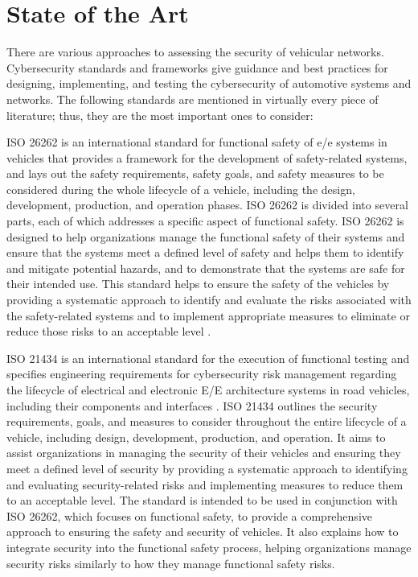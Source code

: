 \chapter{State of the Art}
\label{chp:stateoftheart}

There are various approaches to assessing the security of vehicular networks. Cybersecurity standards and frameworks give guidance and best practices for designing, implementing, and testing the cybersecurity of automotive systems and networks. 
The following standards are mentioned in virtually every piece of literature; thus, they are the most important ones to consider:

ISO 26262 is an international standard for functional safety of \gls{e/e} systems in vehicles that provides a framework for the development of safety-related systems, 
and lays out the safety requirements, safety goals, and safety measures to be considered during the whole lifecycle of a vehicle, including the design, development, production, and operation phases.
ISO 26262 is divided into several parts, each of which addresses a specific aspect of functional safety.
ISO 26262 is designed to help organizations manage the functional safety of their systems and ensure that the systems meet a defined level of safety and helps them to identify and mitigate potential hazards, and to demonstrate that the systems are safe for their intended use. 
This standard helps to ensure the safety of the vehicles by providing a systematic approach to identify and evaluate the risks associated with the safety-related systems and to implement appropriate measures to eliminate or reduce those risks to an acceptable level \cite{iso26262}.

ISO 21434 is an international standard for the execution of functional testing and specifies engineering requirements for cybersecurity risk 
management regarding the lifecycle of electrical and electronic E/E architecture systems in road vehicles, including their components and interfaces \cite{iso21434}.
ISO 21434 outlines the security requirements, goals, and measures to consider throughout the entire lifecycle of a vehicle, including design, development, production, and operation. 
It aims to assist organizations in managing the security of their vehicles and ensuring they meet a defined level of security by providing a systematic approach to identifying and evaluating security-related risks and implementing measures to reduce them to an acceptable level. 
The standard is intended to be used in conjunction with ISO 26262, which focuses on functional safety, to provide a comprehensive approach to ensuring the safety and security of vehicles. 
It also explains how to integrate security into the functional safety process, helping organizations manage security risks similarly to how they manage functional safety risks.

